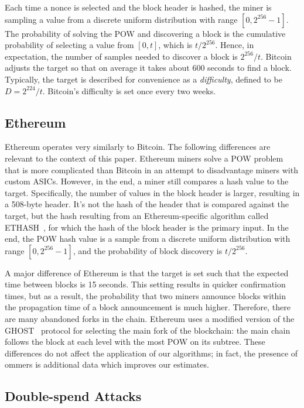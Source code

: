 \documentclass[10pt,sigconf]{acmart}
\newcommand{\1}{{\em (i)}}
\newcommand{\2}{{\em (ii)}}
\newcommand{\3}{{\em (iii)}}
\newcommand{\4}{{\em (iv)}}
\newcommand{\5}{{\em (v)}}
\begin{document}
Each time a nonce is selected and the block
header is hashed, the miner is sampling a value from a discrete uniform
distribution with range $[0,2^{256}-1]$. The probability of solving the POW and
discovering a block is the cumulative probability of selecting a value
from $[0,t]$, which is $t/{2^{256}}$. Hence, in expectation, the
number of samples needed to discover a block is ${2^{256}/t}$. Bitcoin
adjusts the target so that on average it takes about 600 seconds to
find a block. Typically, the target is described for convenience as a
{\em difficulty}, defined to be $D=2^{224}/t$. Bitcoin's difficulty
is set once every two weeks.


\subsection{Ethereum} Ethereum operates very similarly to Bitcoin. The
following differences are relevant to the context of this paper.
Ethereum miners solve a POW problem that is more complicated
than Bitcoin in an attempt to disadvantage miners with custom ASICs.
However, in the end, a miner still compares a hash value to the target.
Specifically, the number of values in the block header is larger,
resulting in a 508-byte header. It's not the hash of the header that
is compared against the target, but the hash resulting from an
Ethereum-specific algorithm called ETHASH~\cite{ETHASH}, for which the
hash of the block header is the primary input. In the end, the POW
hash value is a sample from a discrete uniform distribution with range
$[0,2^{256}-1]$, and the probability of block discovery is
${t/2^{256}}$.

A major difference of Ethereum is that the target is set such that the
expected time between blocks is 15 seconds. This setting results
in quicker confirmation times, but as a result, the probability that two
miners announce blocks within the propagation time of a block
announcement is much higher. Therefore, there are many abandoned
forks in the chain. Ethereum uses a modified version of the GHOST~\cite{Sompolinsky:2015}
protocol for selecting the main fork of the blockchain: the main chain
follows the block at each level with the most POW on its subtree.
These differences do not affect the application of our algorithms; in
fact, the presence of ommers is additional data which improves our
estimates.

\subsection{Double-spend Attacks}
\label{sec:ds}
\end{document}
